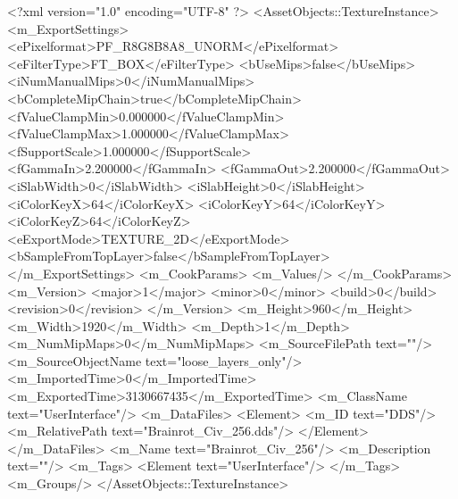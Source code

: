 <?xml version="1.0" encoding="UTF-8" ?>
<AssetObjects::TextureInstance>
	<m_ExportSettings>
		<ePixelformat>PF_R8G8B8A8_UNORM</ePixelformat>
		<eFilterType>FT_BOX</eFilterType>
		<bUseMips>false</bUseMips>
		<iNumManualMips>0</iNumManualMips>
		<bCompleteMipChain>true</bCompleteMipChain>
		<fValueClampMin>0.000000</fValueClampMin>
		<fValueClampMax>1.000000</fValueClampMax>
		<fSupportScale>1.000000</fSupportScale>
		<fGammaIn>2.200000</fGammaIn>
		<fGammaOut>2.200000</fGammaOut>
		<iSlabWidth>0</iSlabWidth>
		<iSlabHeight>0</iSlabHeight>
		<iColorKeyX>64</iColorKeyX>
		<iColorKeyY>64</iColorKeyY>
		<iColorKeyZ>64</iColorKeyZ>
		<eExportMode>TEXTURE_2D</eExportMode>
		<bSampleFromTopLayer>false</bSampleFromTopLayer>
	</m_ExportSettings>
	<m_CookParams>
		<m_Values/>
	</m_CookParams>
	<m_Version>
		<major>1</major>
		<minor>0</minor>
		<build>0</build>
		<revision>0</revision>
	</m_Version>
	<m_Height>960</m_Height>
	<m_Width>1920</m_Width>
	<m_Depth>1</m_Depth>
	<m_NumMipMaps>0</m_NumMipMaps>
	<m_SourceFilePath text=""/>
	<m_SourceObjectName text="loose_layers_only"/>
	<m_ImportedTime>0</m_ImportedTime>
	<m_ExportedTime>3130667435</m_ExportedTime>
	<m_ClassName text="UserInterface"/>
	<m_DataFiles>
		<Element>
			<m_ID text="DDS"/>
			<m_RelativePath text="Brainrot_Civ_256.dds"/>
		</Element>
	</m_DataFiles>
	<m_Name text="Brainrot_Civ_256"/>
	<m_Description text=""/>
	<m_Tags>
		<Element text="UserInterface"/>
	</m_Tags>
	<m_Groups/>
</AssetObjects::TextureInstance>

